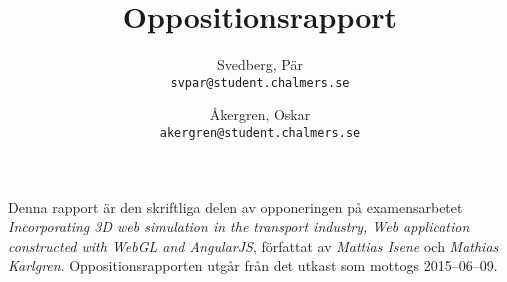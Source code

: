 \documentclass[a4paper, 11pt]{article}
\author{
    Svedberg, Pär \\ \texttt{svpar@student.chalmers.se}
    \and
    Åkergren, Oskar \\ \texttt{akergren@student.chalmers.se}
}
\title{\vspace{-3cm}Oppositionsrapport}
\begin{document}
\maketitle
\vspace{-0.5cm}Denna rapport är den skriftliga delen av opponeringen på examensarbetet \emph{Incorporating 3D web simulation in the transport industry, Web application constructed with WebGL and AngularJS}, författat av \emph{Mattias Isene} och \emph{Mathias Karlgren}. Oppositions\-rapporten utgår från det utkast som mottogs 2015--06--09.



\newpage

\end{document}
